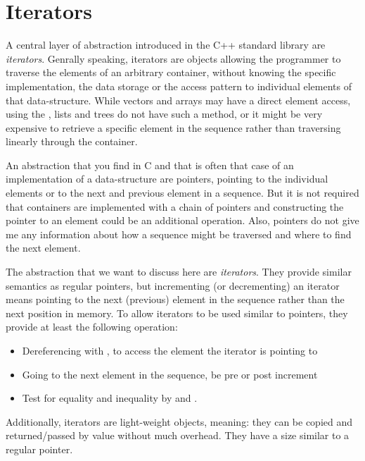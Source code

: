 \chapter{Iterators}
A central layer of abstraction introduced in the C++ standard library are \emph{iterators}. Genrally speaking, iterators are objects allowing the
programmer to traverse the elements of an arbitrary container, without knowing the specific implementation, the data storage or the access pattern to
individual elements of that data-structure. While vectors and arrays may have a direct element access, using the , lists and trees do
not have such a method, or it might be very expensive to retrieve a specific element in the sequence rather than traversing linearly through the container.

An abstraction that you find in C and that is often that case of an implementation of a data-structure are pointers, pointing to the individual elements or
to the next and previous element in a sequence. But it is not required that containers are implemented with a chain of pointers and constructing the pointer
to an element could be an additional operation. Also, pointers do not give me any information about how a sequence might be traversed and where to find the
next element.

The abstraction that we want to discuss here are \emph{iterators}. They provide similar semantics as regular pointers, but incrementing (or decrementing)
an iterator means pointing to the next (previous) element in the sequence rather than the next position in memory. To allow iterators to be used similar to
pointers, they provide at least the following operation:

\begin{itemize}
  \item Dereferencing with , to access the element the iterator is pointing to
  \item Going to the next element in the sequence, be pre or post increment 
  \item Test for equality and inequality by  and .
\end{itemize}

Additionally, iterators are light-weight objects, meaning: they can be copied and returned/passed by value without much overhead. They have a size similar
to a regular pointer.

